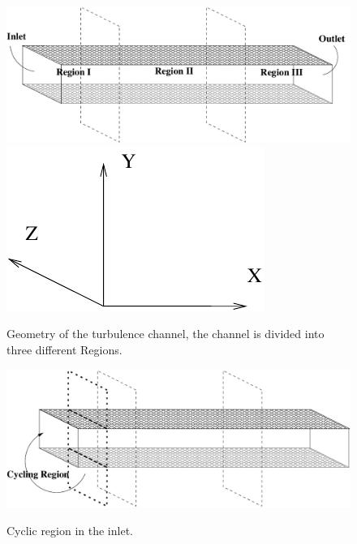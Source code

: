 \documentclass[twocolumn,10pt]{asme2e}
\begin{document}
\begin{figure}[t]
	\centering
	\scalebox{0.5}
	{\includegraphics{geometry_turbchannel.pdf}}
	\scalebox{0.4}
	{\includegraphics{axis.pdf}}
	\caption{Geometry of the turbulence channel, the channel is divided into three different Regions.}
	\label{fig:geometry_turbchannel}
	\end{figure}

\begin{figure}[t]
	\centering
	\scalebox{0.5}
	{\includegraphics{cycling_region.pdf}}
	\caption{Cyclic region in the inlet.}
	\label{fig:cycling_region}
\end{figure}
\end{document}
